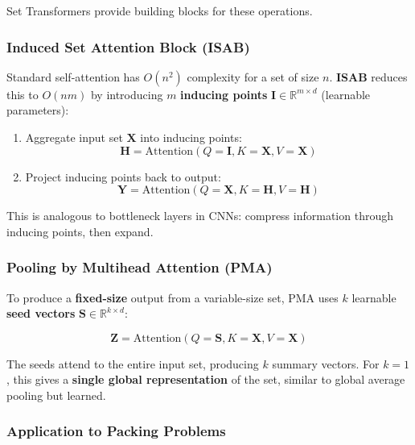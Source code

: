 Set Transformers provide building blocks for these operations.

\subsubsection{Induced Set Attention Block (ISAB)}

Standard self-attention has $O(n^2)$ complexity for a set of size $n$. \textbf{ISAB} reduces this to $O(nm)$ by introducing $m$ \textbf{inducing points} $\mathbf{I} \in \mathbb{R}^{m \times d}$ (learnable parameters):

\begin{enumerate}
\item Aggregate input set $\mathbf{X}$ into inducing points:
   \begin{equation}
   \mathbf{H} = \text{Attention}(Q=\mathbf{I}, K=\mathbf{X}, V=\mathbf{X})
   \end{equation}

\item Project inducing points back to output:
   \begin{equation}
   \mathbf{Y} = \text{Attention}(Q=\mathbf{X}, K=\mathbf{H}, V=\mathbf{H})
   \end{equation}
\end{enumerate}

This is analogous to bottleneck layers in CNNs: compress information through inducing points, then expand.

\subsubsection{Pooling by Multihead Attention (PMA)}

To produce a \textbf{fixed-size} output from a variable-size set, PMA uses $k$ learnable \textbf{seed vectors} $\mathbf{S} \in \mathbb{R}^{k \times d}$:

\begin{equation}
\mathbf{Z} = \text{Attention}(Q=\mathbf{S}, K=\mathbf{X}, V=\mathbf{X})
\end{equation}

The seeds attend to the entire input set, producing $k$ summary vectors. For $k=1$, this gives a \textbf{single global representation} of the set, similar to global average pooling but learned.

\subsubsection{Application to Packing Problems}

